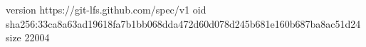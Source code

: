 version https://git-lfs.github.com/spec/v1
oid sha256:33ca8a63ad19618fa7b1bb068dda472d60d078d245b681e160b687ba8ac51d24
size 22004
